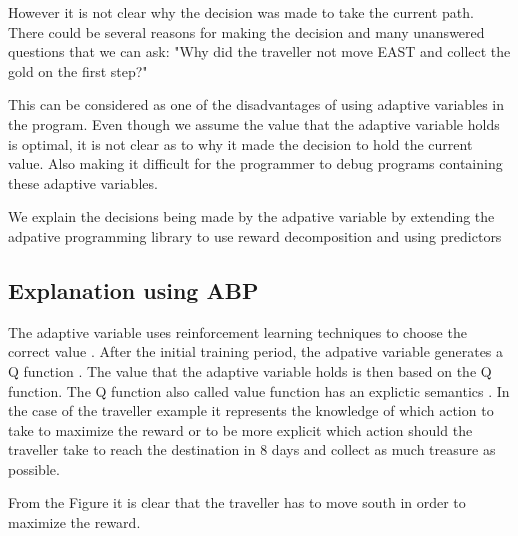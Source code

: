 \documentclass[conference]{IEEEtran}
\begin{document}
However it is not clear why the decision was made to take the current path. There could be several reasons
for making the decision and many unanswered questions that we can ask:
"Why did the traveller not move EAST and collect the gold on the first step?"

This can be considered as one of the disadvantages of using adaptive variables in the program.
Even though we assume the value that the adaptive variable holds is optimal, it is not clear as to why
it made the decision to hold the current value. Also making it difficult for
the programmer to debug programs containing these adaptive variables.

We explain the decisions being made by the adpative variable by extending the adpative programming library
to use reward decomposition and using predictors


\subsection{Explanation using ABP}

The adaptive variable uses reinforcement learning techniques to choose the correct value \cite{bauer2011adaptation}.
After the initial training period, the adpative variable generates a Q function \cite{bauer2011adaptation}. The value
that the adaptive variable holds is then based on the Q function. The Q function also called value function has
an explictic semantics \cite{sutton2011horde}. In the case of the traveller example it represents the knowledge of
which action to take to maximize the reward or to be more explicit which action should the traveller take to reach the
destination in 8 days and collect as much treasure as possible.


From the Figure it is clear that the traveller has to move south in order to maximize the reward.
\end{document}
